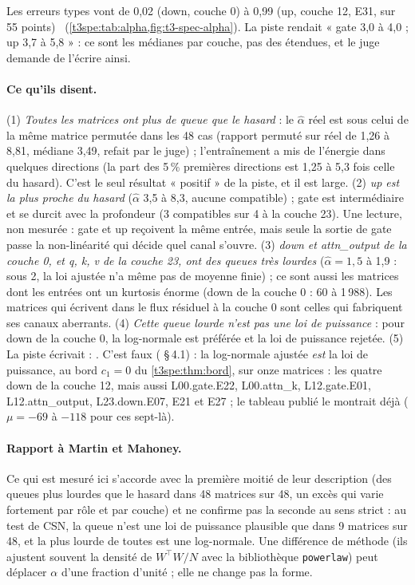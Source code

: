 Les erreurs types vont de 0,02 (down, couche 0) à 0,99 (up, couche 12, E31, sur 55 points) \mes~(\cref{t3spe:tab:alpha,fig:t3-spec-alpha}). La piste rendait « gate 3,0 à 4,0 ; up 3,7 à 5,8 » : ce sont les médianes par couche, pas des étendues, et le juge demande de l'écrire ainsi.

\paragraph{Ce qu'ils disent.}
(1) \emph{Toutes les matrices ont plus de queue que le hasard} : le $\hat\alpha$ réel est sous celui de la même matrice permutée dans les 48 cas (rapport permuté sur réel de 1,26 à 8,81, médiane 3,49, refait par le juge) ; l'entraînement a mis de l'énergie dans quelques directions (la part des 5\,\% premières directions est 1,25 à 5,3 fois celle du hasard). C'est le seul résultat « positif » de la piste, et il est large.
(2) \emph{up est la plus proche du hasard} ($\hat\alpha$ 3,5 à 8,3, aucune compatible) ; gate est intermédiaire et se durcit avec la profondeur (3 compatibles sur 4 à la couche 23). Une lecture, non mesurée : gate et up reçoivent la même entrée, mais seule la sortie de gate passe la non-linéarité qui décide quel canal s'ouvre.
(3) \emph{down et attn\_output de la couche 0, et q, k, v de la couche 23, ont des queues très lourdes} ($\hat\alpha = 1{,}5$ à 1,9 : sous 2, la loi ajustée n'a même pas de moyenne finie) ; ce sont aussi les matrices dont les entrées ont un kurtosis énorme (down de la couche 0 : 60 à 1\,988). Les matrices qui écrivent dans le flux résiduel à la couche 0 sont celles qui fabriquent ses canaux aberrants.
(4) \emph{Cette queue lourde n'est pas une loi de puissance} : pour down de la couche 0, la log-normale est préférée et la loi de puissance rejetée.
(5) La piste écrivait : . C'est faux ( §\,4.1) : la log-normale ajustée \emph{est} la loi de puissance, au bord $c_1 = 0$ du \cref{t3spe:thm:bord}, sur onze matrices : les quatre down de la couche 12, mais aussi L00.gate.E22, L00.attn\_k, L12.gate.E01, L12.attn\_output, L23.down.E07, E21 et E27 ; le tableau publié le montrait déjà ($\mu = -69$ à $-118$ pour ces sept-là).

\paragraph{Rapport à Martin et Mahoney.} Ce qui est mesuré ici s'accorde avec la première moitié de leur description (des queues plus lourdes que le hasard dans 48 matrices sur 48, un excès qui varie fortement par rôle et par couche) et ne confirme pas la seconde au sens strict : au test de CSN, la queue n'est une loi de puissance plausible que dans 9 matrices sur 48, et la plus lourde de toutes est une log-normale. Une différence de méthode (ils ajustent souvent la densité de $W^\top W/N$ avec la bibliothèque \texttt{powerlaw}) peut déplacer $\alpha$ d'une fraction d'unité ; elle ne change pas la forme.

